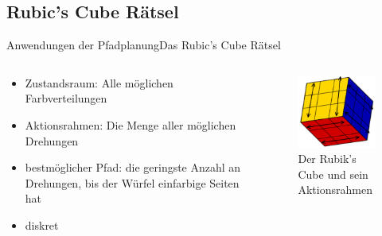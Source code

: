 \documentclass[t,aspectratio=169,dvipsnames]{beamer}
\begin{document}
\subsection{Rubic's Cube Rätsel}
\begin{frame}{Anwendungen der Pfadplanung}{Das Rubic's Cube Rätsel}
	\begin{columns}
		\begin{column}[T]{0.5\textwidth}
				\begin{itemize}
					\item Zustandsraum: Alle möglichen Farbverteilungen
					\item Aktionsrahmen: Die Menge aller möglichen Drehungen
					\item bestmöglicher Pfad: die geringste Anzahl an Drehungen, bis der Würfel einfarbige Seiten hat
					\item diskret
				\end{itemize}
		\end{column}
		\begin{column}[T]{0.5\textwidth}
			\begin{figure}
				\includegraphics[width=4.5cm]{images/img229_a.png}
				\caption{Der Rubik's Cube und sein Aktionsrahmen \cite[In Anlehnung an Abb.1.1, S.5]{Lav06}}
			\end{figure}
		\end{column}
	\end{columns}
\end{frame}
\end{document}
